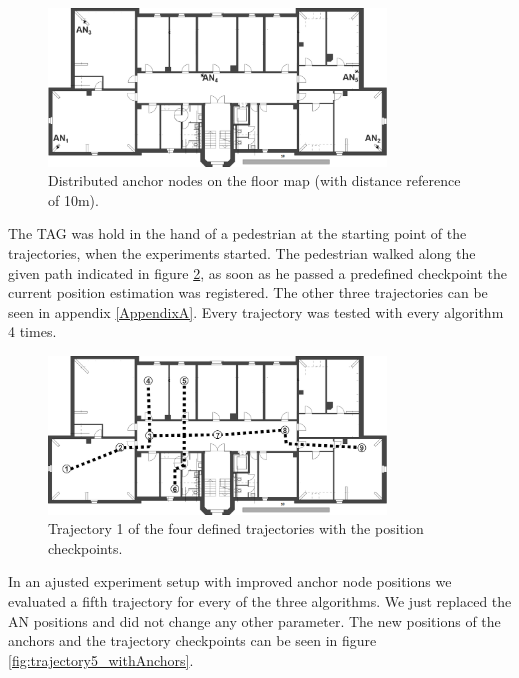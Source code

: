 \begin{figure}[th]
\centering
\includegraphics[width=0.8\textwidth]{Figures/anchor_position}
\decoRule
\caption[Anchor Node Positions]{Distributed anchor nodes on the floor map (with distance reference of 10m).}
\label{fig:anchor_position}
\end{figure}

The TAG was hold in the hand of a pedestrian at the starting point of the trajectories, when the experiments started. The pedestrian walked along the given path indicated in figure \ref{fig:trajectory1}, as soon as he passed a predefined checkpoint the current position estimation was registered. The other three trajectories can be seen in appendix \ref{AppendixA}. Every trajectory was tested with every algorithm 4 times.

\begin{figure}[th]
\centering
\includegraphics[width=0.8\textwidth]{Figures/trajectory1}
\decoRule
\caption[Trajectory 1]{Trajectory 1 of the four defined trajectories with the position checkpoints.}
\label{fig:trajectory1}
\end{figure}

In an ajusted experiment setup with improved anchor node positions we evaluated a fifth trajectory for every of the three algorithms. We just replaced the AN positions and did not change any other parameter. The new positions of the anchors and the trajectory checkpoints can be seen in figure \ref{fig:trajectory5_withAnchors}.

